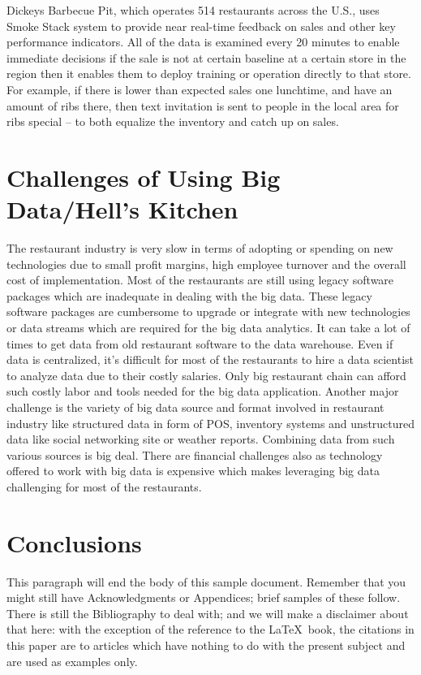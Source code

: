 \documentclass[sigconf]{acmart}
\begin{document}
 Dickeys Barbecue Pit, which operates 514 restaurants across the U.S., uses Smoke Stack system to provide near real-time feedback on sales and other key performance indicators. All of the data is examined every 20 minutes to enable immediate decisions if the sale is not at certain baseline at a certain store in the region then it enables them to deploy training or operation directly to that store. For example, if there is lower than expected sales one lunchtime, and have an amount of ribs there, then text invitation is sent to people in the local area for ribs special – to both equalize the inventory and catch up on sales.\cite{www-forbes}

\section{Challenges of Using Big Data/Hell's Kitchen}
The restaurant industry is very slow in terms of adopting or spending on new technologies due to small profit margins, high employee turnover and the overall cost of implementation\cite{www-bostonglobe}. Most of the restaurants are still using legacy software packages which are inadequate in dealing with the big data. These legacy software packages are cumbersome to upgrade or integrate with new technologies or data streams which are required for the big data analytics. It can take a lot of times to get data from old restaurant software to the data warehouse. Even if data is centralized, it's difficult for most of the restaurants to hire a data scientist to analyze data due to their costly salaries. Only big restaurant chain can afford such costly labor and tools needed for the big data application\cite{2015BDLC}. Another major challenge is the variety of big data source and format involved in restaurant industry like structured data in form of POS, inventory systems and unstructured data like social networking site or weather reports. Combining data from such various sources is big deal. There are financial challenges also as technology offered to work with big data is expensive which makes leveraging big data challenging for most of the restaurants.\cite{www-foodnewsfeed}

\section{Conclusions}

This paragraph will end the body of this sample document.  Remember
that you might still have Acknowledgments or Appendices; brief samples
of these follow.  There is still the Bibliography to deal with; and we
will make a disclaimer about that here: with the exception of the
reference to the \LaTeX\ book, the citations in this paper are to
articles which have nothing to do with the present subject and are
used as examples only.
\end{document}
